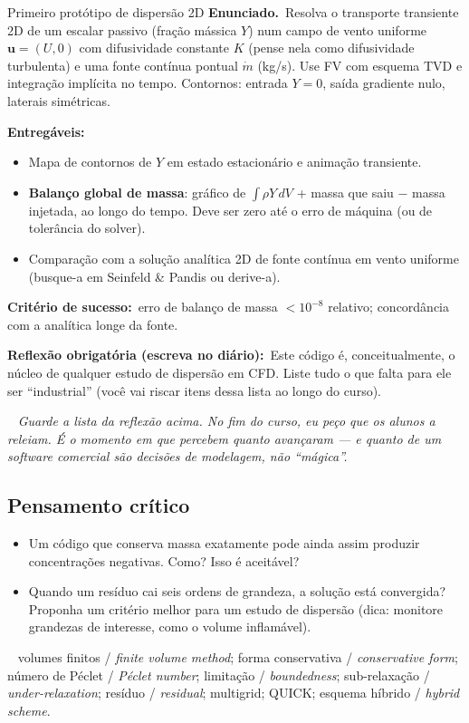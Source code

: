 \documentclass[10pt,a4paper,twocolumn,openany]{report}
\newcommand{\lead}[2]{\par\medskip\noindent{\color{#1}\bfseries #2}\ }
\newenvironment{professor}{\lead{laranja}{Nota do professor.}\itshape}{\par\medskip}
\newenvironment{critico}{\subsection*{\textcolor{roxo}{Pensamento crítico}}}{\par}
\newenvironment{chaves}{\lead{cinza}{Palavras-chave (PT/EN):}\small}{\par}
\newcommand{\enunciado}{\noindent\textbf{Enunciado.}\ }
\newcommand{\entregaveis}{\par\medskip\noindent\textbf{Entregáveis:}}
\newcommand{\criterio}{\par\medskip\noindent\textbf{Critério de sucesso:}\ }
\newcommand{\reflexao}{\par\medskip\noindent\textbf{Reflexão obrigatória (escreva no diário):}}
\begin{document}
\begin{tarefa}{Primeiro protótipo de dispersão 2D}
\enunciado Resolva o transporte transiente 2D de um escalar passivo
(fração mássica $Y$) num campo de vento uniforme $\mathbf{u}=(U,0)$ com
difusividade constante $K$ (pense nela como difusividade turbulenta) e uma
fonte contínua pontual $\dot m$ (kg/s). Use FV com esquema TVD e integração
implícita no tempo. Contornos: entrada $Y=0$, saída gradiente nulo, laterais
simétricas.
\entregaveis
\begin{itemize}
  \item Mapa de contornos de $Y$ em estado estacionário e animação transiente.
  \item \textbf{Balanço global de massa}: gráfico de
        $\int\rho Y\,dV$ + massa que saiu $-$ massa injetada, ao longo do tempo.
        Deve ser zero até o erro de máquina (ou de tolerância do solver).
  \item Comparação com a solução analítica 2D de fonte contínua em vento
        uniforme (busque-a em Seinfeld \& Pandis ou derive-a).
\end{itemize}
\criterio erro de balanço de massa $<10^{-8}$ relativo; concordância com a
analítica longe da fonte.
\reflexao\ Este código é, conceitualmente, o núcleo de qualquer estudo de
dispersão em CFD. Liste tudo o que falta para ele ser ``industrial''
(você vai riscar itens dessa lista ao longo do curso).
\end{tarefa}

\begin{professor}
Guarde a lista da reflexão acima. No fim do curso, eu peço que os alunos a
releiam. É o momento em que percebem quanto avançaram --- e quanto de um
software comercial são decisões de modelagem, não ``mágica''.
\end{professor}

\begin{critico}
\begin{itemize}
  \item Um código que conserva massa exatamente pode ainda assim produzir
        concentrações negativas. Como? Isso é aceitável?
  \item Quando um resíduo cai seis ordens de grandeza, a solução está
        convergida? Proponha um critério melhor para um estudo de dispersão
        (dica: monitore grandezas de interesse, como o volume inflamável).
\end{itemize}
\end{critico}

\begin{chaves}
volumes finitos / \emph{finite volume method}; forma conservativa /
\emph{conservative form}; número de Péclet / \emph{Péclet number};
limitação / \emph{boundedness}; sub-relaxação / \emph{under-relaxation};
resíduo / \emph{residual}; multigrid; QUICK; esquema híbrido /
\emph{hybrid scheme}.
\end{chaves}
\end{document}
